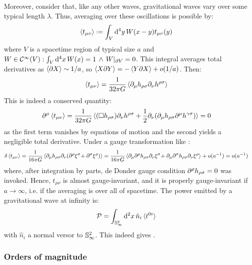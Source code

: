 Moreover, consider that, like any other waves, gravitational waves vary over some typical length $ \lambda $. Thus, averaging over these oscillations is possible by:
\begin{equation*}
  \braket{t_{\mu \nu}} \defeq \int_V \dd^4 y\, W(x - y) t_{\mu \nu}(y)
\end{equation*}
where $ V $ is a spacetime region of typical size $ a $ and $ W \in \mathcal{C}^{\infty}(V) : \int_V \mathrm{d}^4 x\, W(x) = 1 \,\land\, W\vert_{\partial V} = 0 $. This integral averages total derivatives as $ \braket{\partial X} \sim 1/a $, so $ \braket{X \partial Y} = - \braket{Y \partial X} + o(1/a) $. Then:
\begin{equation}
  \braket{t_{\mu \nu}} = \frac{1}{32\pi G} \braket{\partial_\mu h_{\rho \sigma} \partial_\nu h^{\rho \sigma}}
\end{equation}
This is indeed a conserved quantity:
\begin{equation*}
  \partial^\mu \braket{t_{\mu \nu}} = \frac{1}{32\pi G} \braket{(\Box h_{\rho \sigma}) \partial_\nu h^{\rho \sigma} + \frac{1}{2} \partial_\nu (\partial_\mu h_{\rho \sigma} \partial^\mu h^{\gamma \sigma})} = 0
\end{equation*}
as the first term vanishes by equations of motion and the second yields a negligible total derivative. Under a gauge transformation like :
\begin{equation*}
  \delta \braket{t_{\mu \nu}} = \frac{1}{16\pi G} \braket{\partial_\mu h_{\rho \sigma} \partial_\nu (\partial^\rho \xi^\sigma \hspace{-0.2em} + \partial^\sigma \xi^\rho)} = \frac{1}{16\pi G} \braket{\partial_\mu \partial^\rho h_{\rho \sigma} \partial_\nu \xi^\sigma \hspace{-0.2em} + \partial_\mu \partial^\sigma h_{\rho \sigma} \partial_\nu \xi^\rho} + o(a^{-1}) = o(a^{-1})
\end{equation*}
where, after integration by parts, de Donder gauge condition $ \partial^\rho h_{\rho \sigma} = 0 $ was invoked. Hence, $ t_{\mu \nu} $ is almost gauge-invariant, and it is properly gauge-invariant if $ a \rightarrow \infty $, i.e. if the averaging is over all of spacetime. The power emitted by a gravitational wave at infinity is:
\begin{equation*}
  \mathcal{P} = \int_{\mathbb{S}^{2}_{\infty}} \mathrm{d}^2 x\, \hat{n}_i \braket{t^{0i}}
\end{equation*}
with $ \hat{n}_i $ a normal versor to $ \mathbb{S}^{2}_{\infty} $. This indeed gives .

\subsubsection{Orders of magnitude}

